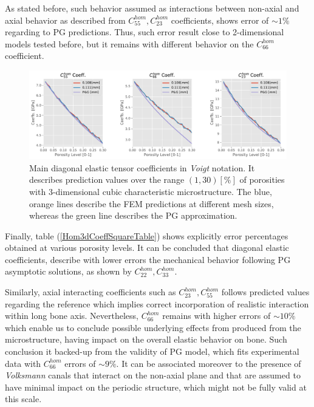 As stated before, such behavior assumed as interactions between non-axial and axial behavior as described from $C_{55}^{hom}, C_{23}^{hom}$ coefficients, shows error of $\sim 1 \%$ regarding to PG predictions. Thus, such error result close to 2-dimensional models tested before, but it remains with different behavior on the $C_{66}^{hom}$ coefficient.

\begin{figure}[!h]
	\centering
	\includegraphics[scale=.5]{images/CellsProb/3DCellProb_OthersHomCoeffsCircular.pdf}
	\caption{Main diagonal elastic tensor coefficients in \textit{Voigt} notation. It describes prediction values over the range $(1,30) [\%]$ of porosities with 3-dimensional cubic characteristic microstructure. The blue, orange lines describe the FEM predictions at different mesh sizes, whereas the green line describes the PG approximation.}
	\label{Other3dHomCoeffSquare}
\end{figure}

Finally, table (\ref{Hom3dCoeffSquareTable}) shows explicitly error percentages obtained at various porosity levels. It can be concluded that diagonal elastic coefficients, describe with lower errors the mechanical behavior following PG asymptotic solutions, as shown by $C_{22}^{hom}, C_{33}^{hom}$. 

Similarly, axial interacting coefficients such as $C_{23}^{hom}, C_{55}^{hom}$ follows predicted values regarding the reference which implies correct incorporation of realistic interaction within long bone axis. Nevertheless, $C_{66}^{hom}$ remains with higher errors of $\sim 10 \%$ which enable us to conclude possible underlying effects from produced from the microstructure, having impact on the overall elastic behavior on bone. Such conclusion it backed-up from the validity of PG model, which fits experimental data with $C_{66}^{hom}$ errors of $\sim 9 \%$. It can be associated moreover to the presence of \textit{Volksmann} canals that interact on the non-axial plane and that are assumed to have minimal impact on the periodic structure, which might not be fully valid at this scale.

